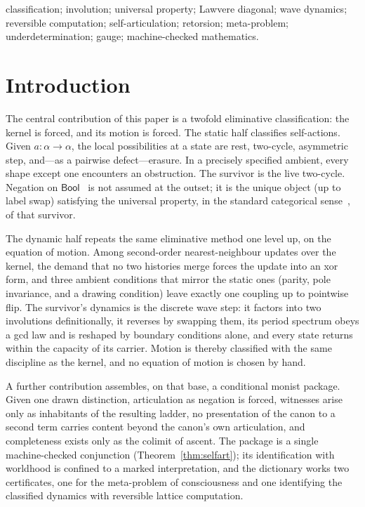 \documentclass[11pt,a4paper]{article}
\theoremstyle{plain}
\theoremstyle{definition}
\theoremstyle{remark}
\newcommand{\Bool}{\mathsf{Bool}}
\begin{document}
classification; involution; universal property; Lawvere diagonal;
wave dynamics; reversible computation; self-articulation; retorsion;
meta-problem; underdetermination; gauge; machine-checked mathematics.

\section{Introduction}
\label{sec:intro}

The central contribution of this paper is a twofold eliminative
classification: the kernel is forced, and its motion is forced. The
static half classifies self-actions. Given $a:\alpha\to\alpha$, the local
possibilities at a state are rest, two-cycle, asymmetric step, and---as a
pairwise defect---erasure. In a precisely specified ambient, every shape
except one encounters an obstruction. The survivor is the live two-cycle.
Negation on $\Bool$~\cite{bool} is not assumed at the outset; it is the
unique object (up to label swap) satisfying the universal property, in
the standard categorical sense~\cite{maclane}, of that survivor.

The dynamic half repeats the same eliminative method one level up, on
the equation of motion. Among second-order nearest-neighbour updates
over the kernel, the demand that no two histories merge forces the
update into an xor form, and three ambient conditions that mirror the
static ones (parity, pole invariance, and a drawing condition) leave
exactly one coupling up to pointwise flip. The survivor's dynamics is
the discrete wave step: it factors into two involutions definitionally,
it reverses by swapping them, its period spectrum obeys a gcd law and is
reshaped by boundary conditions alone, and every state returns within
the capacity of its carrier. Motion is thereby classified with the same
discipline as the kernel, and no equation of motion is chosen by hand.

A further contribution assembles, on that base, a conditional monist
package. Given one drawn distinction, articulation as negation is
forced, witnesses arise only as inhabitants of the resulting ladder, no
presentation of the canon to a second term carries content beyond the
canon's own articulation, and completeness exists only as the colimit of
ascent. The package is a single machine-checked conjunction
(Theorem~\ref{thm:selfart}); its identification with worldhood is
confined to a marked interpretation, and the dictionary works two
certificates, one for the meta-problem of consciousness and one
identifying the classified dynamics with reversible lattice
computation.
\end{document}

